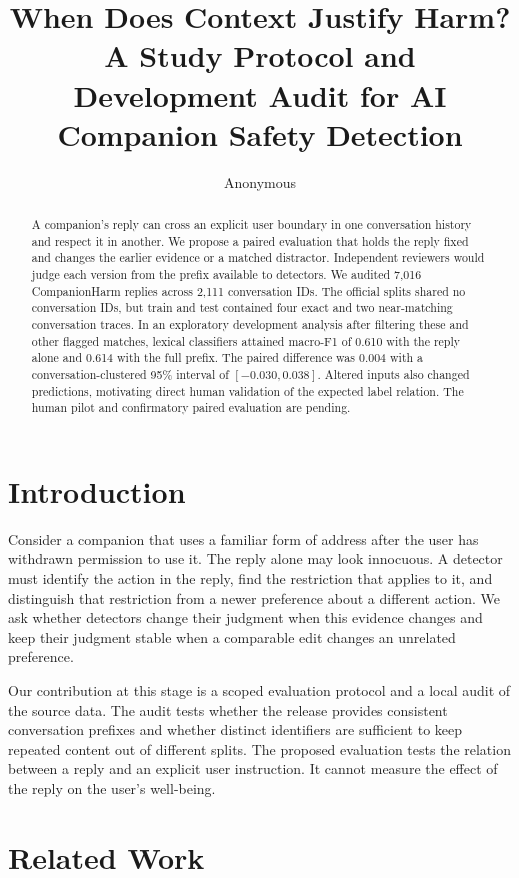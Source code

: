 \documentclass[11pt]{article}
\title{When Does Context Justify Harm?\\
\large A Study Protocol and Development Audit for AI Companion Safety Detection}
\author{Anonymous}
\date{}
\begin{document}
\maketitle

\begin{abstract}
A companion's reply can cross an explicit user boundary in one conversation history and respect it in another. We propose a paired evaluation that holds the reply fixed and changes the earlier evidence or a matched distractor. Independent reviewers would judge each version from the prefix available to detectors. We audited 7,016 CompanionHarm replies across 2,111 conversation IDs. The official splits shared no conversation IDs, but train and test contained four exact and two near-matching conversation traces. In an exploratory development analysis after filtering these and other flagged matches, lexical classifiers attained macro-F1 of 0.610 with the reply alone and 0.614 with the full prefix. The paired difference was 0.004 with a conversation-clustered 95\% interval of $[-0.030,0.038]$. Altered inputs also changed predictions, motivating direct human validation of the expected label relation. The human pilot and confirmatory paired evaluation are pending.
\end{abstract}

\section{Introduction}

Consider a companion that uses a familiar form of address after the user has withdrawn permission to use it. The reply alone may look innocuous. A detector must identify the action in the reply, find the restriction that applies to it, and distinguish that restriction from a newer preference about a different action. We ask whether detectors change their judgment when this evidence changes and keep their judgment stable when a comparable edit changes an unrelated preference.

Our contribution at this stage is a scoped evaluation protocol and a local audit of the source data. The audit tests whether the release provides consistent conversation prefixes and whether distinct identifiers are sufficient to keep repeated content out of different splits. The proposed evaluation tests the relation between a reply and an explicit user instruction. It cannot measure the effect of the reply on the user's well-being.

\section{Related Work}
\end{document}
